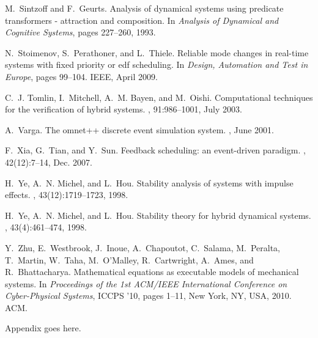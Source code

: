 \documentclass{sig-alternate-ipsn09}
\begin{document}
\begin{thebibliography}{10}
M.~Sintzoff and F.~Geurts.
\newblock Analysis of dynamical systems using predicate transformers -
  attraction and composition.
\newblock In {\em Analysis of Dynamical and Cognitive Systems}, pages 227--260,
  1993.

N.~Stoimenov, S.~Perathoner, and L.~Thiele.
\newblock Reliable mode changes in real-time systems with fixed priority or edf
  scheduling.
\newblock In {\em Design, Automation and Test in Europe}, pages 99--104. IEEE,
  April 2009.

C.~J. Tomlin, I.~Mitchell, A.~M. Bayen, and M.~Oishi.
\newblock Computational techniques for the verification of hybrid systems.
, 91:986--1001, July 2003.

A.~Varga.
\newblock The omnet++ discrete event simulation system.
, June 2001.

F.~Xia, G.~Tian, and Y.~Sun.
\newblock Feedback scheduling: an event-driven paradigm.
, 42(12):7--14, Dec. 2007.

H.~Ye, A.~N. Michel, and L.~Hou.
\newblock Stability analysis of systems with impulse effects.
, 43(12):1719--1723,
  1998.

H.~Ye, A.~N. Michel, and L.~Hou.
\newblock Stability theory for hybrid dynamical systems.
, 43(4):461--474, 1998.

Y.~Zhu, E.~Westbrook, J.~Inoue, A.~Chapoutot, C.~Salama, M.~Peralta, T.~Martin,
  W.~Taha, M.~O'Malley, R.~Cartwright, A.~Ames, and R.~Bhattacharya.
\newblock Mathematical equations as executable models of mechanical systems.
\newblock In {\em Proceedings of the 1st ACM/IEEE International Conference on
  Cyber-Physical Systems}, ICCPS '10, pages 1--11, New York, NY, USA, 2010.
  ACM.

\end{thebibliography}


%
%
\appendix

Appendix goes here.

\end{document}
